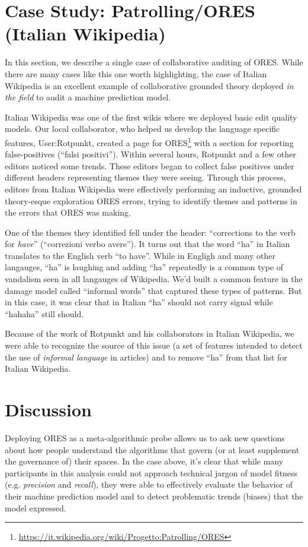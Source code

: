 \documentclass{sigchi-ext}
\begin{document}
\section{Case Study: Patrolling/ORES (Italian Wikipedia)}
In this section, we describe a single case of collaborative auditing of ORES.  While there are many cases like this one worth highlighting, the case of Italian Wikipedia is an excellent example of collaborative grounded theory deployed \emph{in the field} to audit a machine prediction model.

Italian Wikipedia was one of the first wikis where we deployed basic edit quality models.  Our local collaborator, who helped us develop the language specific features, User:Rotpunkt, created a page for ORES\footnote{\url{https://it.wikipedia.org/wiki/Progetto:Patrolling/ORES}} with a section for reporting false-positives (``falsi positivi'').  Within several hours, Rotpunkt and a few other editors noticed some trends.  These editors began to collect false positives under different headers representing themes they were seeing.  Through this process, editors from Italian Wikipedia were effectively performing an inductive, grounded theory-esque exploration ORES errors, trying to identify themes and patterns in the errors that ORES was making.

One of the themes they identified fell under the header: ``corrections to the verb for \emph{have}'' (``correzioni verbo avere'').  It turns out that the word ``ha'' in Italian translates to the English verb ``to have''.  While in Engligh and many other langauges, ``ha'' is laughing and adding ``ha'' repeatedly is a common type of vandalism seen in all langauges of Wikipedia.  We'd built a common feature in the damage model called ``informal words'' that captured these types of patterns.  But in this case, it was clear that in Italian ``ha'' should not carry signal while ``hahaha'' still should.

Because of the work of Rotpunkt and his collaborators in Italian Wikipedia, we were able to recognize the source of this issue (a set of features intended to detect the use of \emph{informal language} in articles) and to remove ``ha'' from that list for Italian Wikipedia.

\section{Discussion}
Deploying ORES as a meta-algorithmic probe allows us to ask new questions about how people understand the algorithms that govern (or at least supplement the governance of) their spaces.  In the case above, it's clear that while many participants in this analysis could not approach technical jargon of model fitness (e.g. \emph{precision} and \emph{recall}), they were able to effectively evaluate the behavior of their machine prediction model and to detect problematic trends (biases) that the model expressed.  
\end{document}
